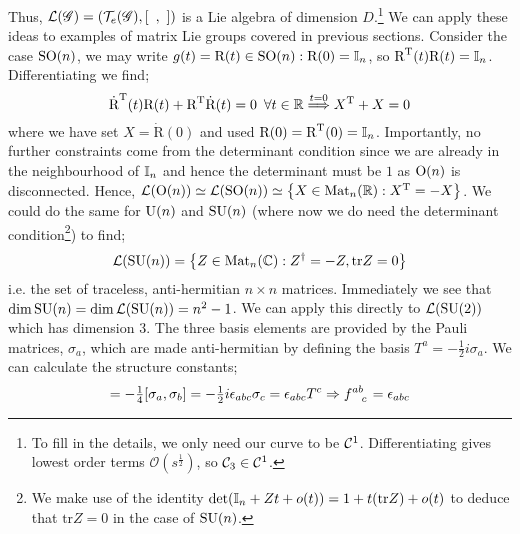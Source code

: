 Thus, $\lie{\group} = \left(\TeG, [\,\,\,,\,\,]\right)$ is a Lie algebra of dimension $D$.\footnote{To fill in the details, we only need our curve to be $\mathcal{C}^1$. Differentiating gives lowest order terms $\mathcal{O}\left(s^{\tfrac{1}{2}}\right)$, so $\mathcal{C}_3 \in \mathcal{C}^1$.} We can apply these ideas to examples of matrix Lie groups covered in previous sections. Consider the case $\SO{n}$, we may write $g(t) = \text{R}(t) \in \SO{n} : \text{R}(0) = \II_n$, so $\text{R}^{\text{T}}(t) \text{R}(t) = \mathbb{I}_n$. Differentiating we find;
\begin{equation}
\dot{\text{R}}^{\text{T}}(t)\text{R}(t) + \text{R}^{\text{T}}\dot{\text{R}}(t) = 0 \,\,\, \forall t \in \mathbb{R} \overset{t = 0}{\Longrightarrow} X^{\text{T}} + X = 0
\end{equation}
where we have set $X = \dot{\text{R}}(0)$ and used $\text{R}(0) = \text{R}^{\text{T}}(0) = \mathbb{I}_n$. Importantly, no further constraints come from the determinant condition since we are already in the neighbourhood of $\mathbb{I}_n$ and hence the determinant must be $1$ as $\Orth{n}$ is disconnected. Hence, $\lie{\Orth{n}} \simeq \lie{\SO{n}} \simeq \set{X \in \text{Mat}_n(\RR) : X^{\text{T}} = - X}$. We could do the same for $\Uni{n}$ and $\SU{n}$ (where now we do need the determinant condition\footnote{We make use of the identity $\det\left(\II_n + Zt + o(t)\right) = 1 + t(\text{tr}Z) + o(t)$ to deduce that $\text{tr}Z = 0$ in the case of $\SU{n}$.}) to find;
\begin{equation}
\lie{\SU{n}} = \set{Z \in \text{Mat}_n(\CC) : Z^\dagger = - Z, \text{tr}Z = 0}
\end{equation}
i.e. the set of traceless, anti-hermitian $n \times n$ matrices. Immediately we see that $\dim \SU{n} = \dim \lie{\SU{n}} = n^2 -1$. We can apply this directly to $\lie{\SU{2}}$ which has dimension $3$. The three basis elements are provided by the Pauli matrices\footnotemark{}, $\sigma_a$, which are made anti-hermitian by defining the basis $T^a = -\tfrac{1}{2} i \sigma_a$. We can calculate the structure constants;
\begin{equation}
[T^a, T^b] = -\tfrac{1}{4}[\sigma_a, \sigma_b] = -\tfrac{1}{2}i\epsilon_{abc}\sigma_c = \epsilon_{abc}T^c \Rightarrow f\indices{^{ab}_{c}} = \epsilon_{abc}
\end{equation}
